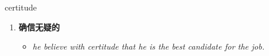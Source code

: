 
\begin{frame}
{\huge certitude}
\begin{center}
\begin{enumerate}\Large
  \item \textbf{确信无疑的}
  \begin{itemize}
    \item \em{\Large{he believe with certitude that he is the best candidate for the job.}}
  \end{itemize}
\end{enumerate}
\end{center}
\end{frame}
